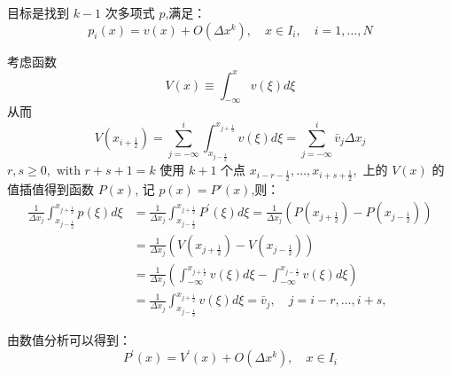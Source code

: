 \documentclass{book}
\begin{document}
目标是找到 $k-1$ 次多项式 $p$,满足：
\begin{equation}
    p_{i}(x)=v(x)+O\left(\Delta x^{k}\right), \quad x \in I_{i}, \quad i=1, \ldots, N
\end{equation}

考虑函数
\begin{equation}
    V(x) \equiv \int_{-\infty}^{x} v(\xi) d \xi
\end{equation}
从而
\begin{equation}
    V\left(x_{i+\frac{1}{2}}\right)=\sum_{j=-\infty}^{i} \int_{x_{j-\frac{1}{2}}}^{x_{j+\frac{1}{2}}} v(\xi) d \xi=\sum_{j=-\infty}^{i} \bar{v}_{j} \Delta x_{j}
\end{equation}
$r, s \geq 0, \text { with } r+s+1=k$
使用 $k+1$ 个点 $x_{i-r-\frac{1}{2}}, \ldots, x_{i+s+\frac{1}{2}},$ 上的 $V(x)$ 的值插值得到函数 $P(x)$, 记 $p(x)=P'(x)$,则：
\begin{equation}
    \begin{aligned}
        \frac{1}{\Delta x_{j}} \int_{x_{j-\frac{1}{2}}}^{x_{j+\frac{1}{2}}} p(\xi) d \xi & =\frac{1}{\Delta x_{j}} \int_{x_{j-\frac{1}{2}}}^{x_{j+\frac{1}{2}}} P^{\prime}(\xi) d \xi=\frac{1}{\Delta x_{j}}\left(P\left(x_{j+\frac{1}{2}}\right)-P\left(x_{j-\frac{1}{2}}\right)\right) \\
                                                                                         & =\frac{1}{\Delta x_{j}}\left(V\left(x_{j+\frac{1}{2}}\right)-V\left(x_{j-\frac{1}{2}}\right)\right)                                                                                           \\
                                                                                         & =\frac{1}{\Delta x_{j}}\left(\int_{-\infty}^{x_{j+\frac{1}{2}}} v(\xi) d \xi-\int_{-\infty}^{x_{j-\frac{1}{2}}} v(\xi) d \xi\right)                                                           \\
                                                                                         & =\frac{1}{\Delta x_{j}} \int_{x_{j-\frac{1}{2}}}^{x_{j+\frac{1}{2}}} v(\xi) d \xi=\bar{v}_{j}, \quad j=i-r, \ldots, i+s,
    \end{aligned}
\end{equation}

由数值分析可以得到：
\begin{equation}
    P^{\prime}(x)=V^{\prime}(x)+O\left(\Delta x^{k}\right), \quad x \in I_{i}
\end{equation}
\end{document}
